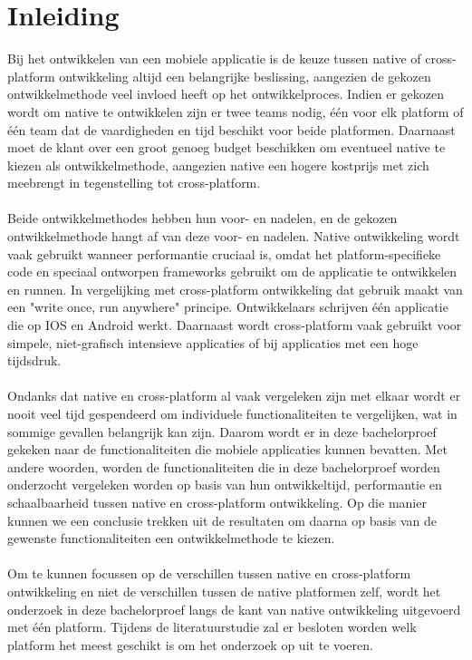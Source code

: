 
\chapter{Inleiding}
\label{ch:inleiding}

Bij het ontwikkelen van een mobiele applicatie is de keuze tussen native of cross-platform ontwikkeling altijd een belangrijke beslissing,
aangezien de gekozen ontwikkelmethode veel invloed heeft op het ontwikkelproces. 
Indien er gekozen wordt om native te ontwikkelen zijn er twee teams nodig, één voor elk platform of één team dat de vaardigheden 
en tijd beschikt voor beide platformen. 
Daarnaast moet de klant over een groot genoeg budget beschikken om eventueel native te kiezen als ontwikkelmethode, 
aangezien native een hogere kostprijs met zich meebrengt in tegenstelling tot cross-platform.
\\\\
Beide ontwikkelmethodes hebben hun voor- en nadelen, en de gekozen ontwikkelmethode hangt af van deze voor- en nadelen. 
Native ontwikkeling wordt vaak gebruikt wanneer performantie cruciaal is, 
omdat het platform-specifieke code en speciaal ontworpen frameworks gebruikt om de applicatie te ontwikkelen en runnen. 
In vergelijking met cross-platform ontwikkeling dat gebruik maakt van een "write once, run anywhere" principe. 
Ontwikkelaars schrijven één applicatie die op IOS en Android werkt. 
Daarnaast wordt cross-platform vaak gebruikt voor simpele, niet-grafisch intensieve applicaties of bij applicaties met een hoge tijdsdruk.
\\\\
Ondanks dat native en cross-platform al vaak vergeleken zijn met elkaar wordt er nooit veel tijd gespendeerd om 
individuele functionaliteiten te vergelijken, wat in sommige gevallen belangrijk kan zijn.
Daarom wordt er in deze bachelorproef gekeken naar de functionaliteiten 
die mobiele applicaties kunnen bevatten. Met andere woorden, worden de functionaliteiten die in deze bachelorproef worden onderzocht
vergeleken worden op basis van hun ontwikkeltijd, performantie en schaalbaarheid tussen native en cross-platform ontwikkeling.
Op die manier kunnen we een conclusie trekken uit de resultaten om daarna op basis van de gewenste functionaliteiten een ontwikkelmethode te kiezen.
\\\\
Om te kunnen focussen op de verschillen tussen native en cross-platform ontwikkeling en niet de verschillen tussen de native platformen zelf,
wordt het onderzoek in deze bachelorproef langs de kant van native ontwikkeling uitgevoerd met één platform. 
Tijdens de literatuurstudie zal er besloten worden welk platform het meest geschikt is om het onderzoek op uit te voeren. 


